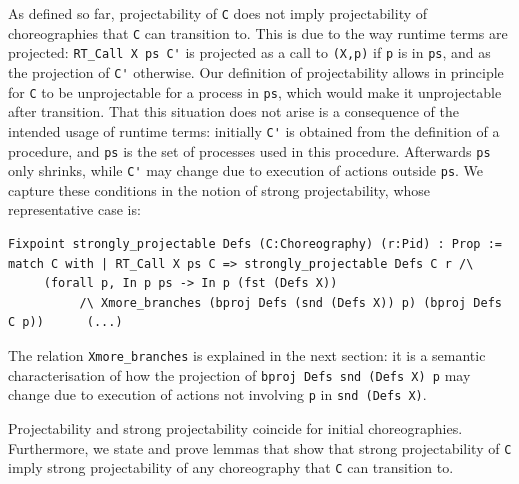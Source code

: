 \documentclass[runningheads]{llncs}
\begin{document}
As defined so far, projectability of \lstinline+C+ does not imply projectability of choreographies
that \lstinline+C+ can transition to.
This is due to the way runtime terms are projected: \lstinline+RT_Call X ps C'+ is projected as a
call to \lstinline+(X,p)+ if \lstinline+p+ is in \lstinline+ps+, and as the projection of
\lstinline+C'+ otherwise.
Our definition of projectability allows in principle for \lstinline+C+ to be unprojectable for a
process in \lstinline+ps+, which would make it unprojectable after transition.
% 
That this situation does not arise is a consequence of the intended usage of runtime terms:
initially \lstinline+C'+ is obtained from the definition of a procedure, and \lstinline+ps+ is the
set of processes used in this procedure.
Afterwards \lstinline+ps+ only shrinks, while \lstinline+C'+ may change due to execution of actions
outside \lstinline+ps+.
We capture these conditions in the notion of strong projectability, whose
representative case is:
\begin{lstlisting}
Fixpoint strongly_projectable Defs (C:Choreography) (r:Pid) : Prop := 
match C with | RT_Call X ps C => strongly_projectable Defs C r /\
     (forall p, In p ps -> In p (fst (Defs X))
          /\ Xmore_branches (bproj Defs (snd (Defs X)) p) (bproj Defs C p))      (...)
\end{lstlisting}
The relation \lstinline+Xmore_branches+ is explained in the next section: it is a semantic
characterisation of how the projection of \lstinline+bproj Defs snd (Defs X) p+ may change due to
execution of actions not involving \lstinline+p+ in \lstinline+snd (Defs X)+.

Projectability and strong projectability coincide for initial choreographies.
Furthermore, we state and prove lemmas that show that strong projectability of \lstinline+C+ imply
strong projectability of any choreography that \lstinline+C+ can transition to.

\end{document}
